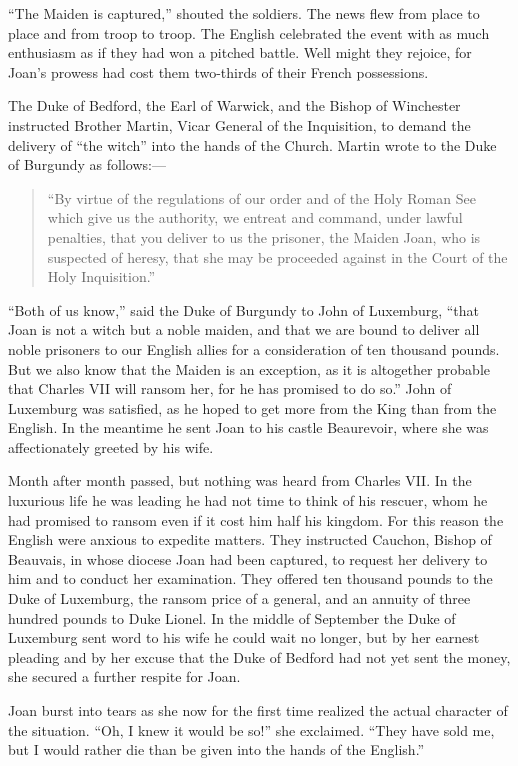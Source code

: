``The Maiden is captured,'' shouted the soldiers. The news flew from
place to place and from troop to troop. The English celebrated the event
with as much enthusiasm as if they had won a pitched battle. Well might
they rejoice, for Joan's prowess had cost them two-thirds of their
French possessions.

The Duke of Bedford, the Earl of Warwick, and the Bishop of Winchester
instructed Brother Martin, Vicar General of the Inquisition, to demand
the delivery of ``the witch'' into the hands of the Church. Martin wrote
to the Duke of Burgundy as follows:---

\begin{quote}
“By virtue of the regulations of our order and of the Holy Roman See
which give us the authority, we entreat and command, under lawful
penalties, that you deliver to us the prisoner, the Maiden Joan, who
is suspected of heresy, that she may be proceeded against in the Court
of the Holy Inquisition.”
\end{quote}

``Both of us know,'' said the Duke of Burgundy to John of Luxemburg,
``that Joan is not a witch but a noble maiden, and that we are bound to
deliver all noble prisoners to our English allies for a consideration of
ten thousand pounds. But we also know that the Maiden is an exception,
as it is altogether probable that Charles VII will ransom her, for he
has promised to do so.'' John of Luxemburg was satisfied, as he hoped to
get more from the King than from the English. In the meantime he sent
Joan to his castle Beaurevoir, where she was affectionately greeted by
his wife.

Month after month passed, but nothing was heard from Charles VII. In the
luxurious life he was leading he had not time to think of his rescuer,
whom he had promised to ransom even if it cost him half his kingdom. For
this reason the English were anxious to expedite matters. They
instructed Cauchon, Bishop of Beauvais, in whose diocese Joan had been
captured, to request her delivery to him and to conduct her examination.
They offered ten thousand pounds to the Duke of Luxemburg, the ransom
price of a general, and an annuity of three hundred pounds to Duke
Lionel. In the middle of September the Duke of Luxemburg sent word to
his wife he could wait no longer, but by her earnest pleading and by her
excuse that the Duke of Bedford had not yet sent the money, she secured
a further respite for Joan.

Joan burst into tears as she now for the first time realized the actual
character of the situation. ``Oh, I knew it would be so!'' she
exclaimed. ``They have sold me, but I would rather die than be given
into the hands of the English.''

